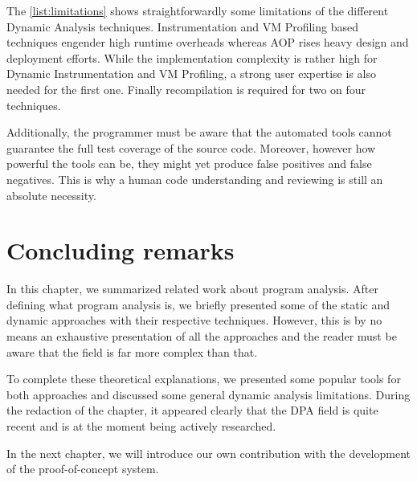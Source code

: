 The \autoref{list:limitations} shows straightforwardly some limitations of the different Dynamic Analysis techniques. Instrumentation and VM Profiling based techniques engender high runtime overheads whereas AOP rises heavy design and deployment efforts. While the implementation complexity is rather high for Dynamic Instrumentation and VM Profiling, a strong user expertise is also needed for the first one. Finally recompilation is required for two on four techniques.

Additionally, the programmer must be aware that the automated tools cannot guarantee the full test coverage of the source code. Moreover, however how powerful the tools can be, they might yet produce false positives and false negatives. This is why a human code understanding and reviewing is still an absolute necessity.

\section{Concluding remarks}

In this chapter, we summarized related work about program analysis. After defining what program analysis is, we briefly presented some of the static and dynamic approaches with their respective techniques. However, this is by no means an exhaustive presentation of all the approaches and the reader must be aware that the field is far more complex than that. 

To complete these theoretical explanations, we presented some popular tools for both approaches and discussed some general dynamic analysis limitations. During the redaction of the chapter, it appeared clearly that the DPA field is quite recent and is at the moment being actively researched. 

In the next chapter, we will introduce our own contribution with the development of the proof-of-concept system.
